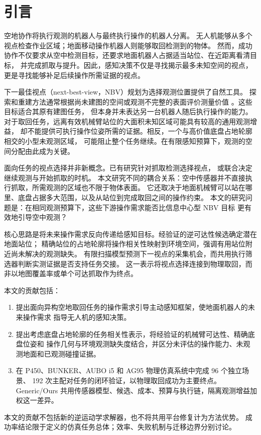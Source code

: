 \section{引言}
\label{sec:introduction}
空地协作将执行观测的机器人与最终执行操作的机器人分离。
无人机能够从多个视点检查作业区域；地面移动操作机器人则能够取回检测到的物体。
然而，成功协作不仅要求从空中检测目标，还要求地面机器人占据适当站位、在近距离看清目标，
并完成抓取与提升。因此，感知决策不仅是寻找揭示最多未知空间的视点，
更是寻找能够补足后续操作所需证据的视点。

下一最佳视点（next-best-view，NBV）规划为选择观测位置提供了自然工具。
探索和重建方法通常根据尚未建图的空间或观测不完整的表面评价测量价值
\cite{bircher2016nbv,border2018see}。这些目标适合其原有建图任务，
但本身并未表达另一台机器人随后执行操作的能力。
对于取回任务，远离有效机械臂站位的大面积未知区域可能具有较高的通用观测增益，
却不能提供可执行操作位姿所需的证据。相反，一个与高价值底盘占地轮廓相交的小型未观测区域，
可能阻止整个任务继续。在有限感知预算下，观测的空间分配由此成为关键。

面向任务的视点选择并非新概念。已有研究针对抓取检测选择视点，
或联合决定继续观测与开始抓取的时机\cite{gualtieri2017viewpoint,breyer2022target}。
本文研究不同的耦合关系：空中传感器并不直接执行抓取，所需观测的区域也不限于物体表面。
它还取决于地面机械臂可以站在哪里、底盘占据多大范围，以及从站位到完成取回之间的操作约束。
本文的研究问题是：在相同观测预算下，这些下游操作需求能否比信息中心型 NBV 目标
更有效地引导空中观测？

核心思路是将未来操作需求反向传递给感知目标。经验证的逆可达性候选确定潜在地面站位；
精确站位的占地轮廓将操作相关性映射到环境空间，强调有用站位附近尚未解决的观测缺失。
有限扫描模型预测下一视点的采集机会，而共用执行筛选器判断实测证据是否支持任务交接。
这一表示将视点选择连接到物理取回，而非以地图覆盖率或单个可达抓取作为终点。

本文的贡献包括：
\begin{enumerate}
\item 提出面向异构空地取回任务的操作需求引导主动感知框架，使地面机器人的未来操作需求
指导无人机的感知决策。
\item 提出考虑底盘占地轮廓的任务相关性表示，将经验证的机械臂可达性、精确底盘位姿和
操作几何与环境观测缺失度结合，并区分未评估的操作能力、未观测地面和已观测碰撞证据。
\item 在 P450、BUNKER、AUBO i5 和 AG95 物理仿真系统中完成 96 个独立场景、
192 次主配对任务的闭环验证，以物理取回成功为主要终点。
Generic/Ours 共用传感器模型、候选、成本、预算与执行链，隔离观测增益加权这一差异。
\end{enumerate}
本文的贡献不包括新的逆运动学求解器，也不将共用平台修复计为方法优势。
成功率结论限于定义的仿真任务总体；效率、失败机制与迁移边界分别讨论。
